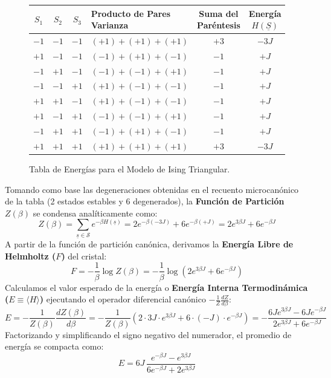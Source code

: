 \begin{ejemplo}
\begin{figure}
    \begin{center}
    \small
    \begin{tabular}{ccc|lc|c}
    $S_1$ & $S_2$ & $S_3$ & Producto de Pares Varianza & Suma del Paréntesis & Energía $H(\underline{S})$ \\
    \hline
    $-1$ & $-1$ & $-1$ & $(+1) + (+1) + (+1)$ & $+3$ & $-3J$ \\
    $+1$ & $-1$ & $-1$ & $(-1) + (+1) + (-1)$ & $-1$ & $+J$ \\
    $-1$ & $+1$ & $-1$ & $(-1) + (-1) + (+1)$ & $-1$ & $+J$ \\
    $-1$ & $-1$ & $+1$ & $(+1) + (-1) + (-1)$ & $-1$ & $+J$ \\
    $+1$ & $+1$ & $-1$ & $(+1) + (-1) + (-1)$ & $-1$ & $+J$ \\
    $+1$ & $-1$ & $+1$ & $(-1) + (-1) + (+1)$ & $-1$ & $+J$ \\
    $-1$ & $+1$ & $+1$ & $(-1) + (+1) + (-1)$ & $-1$ & $+J$ \\
    $+1$ & $+1$ & $+1$ & $(+1) + (+1) + (+1)$ & $+3$ & $-3J$ \\
    \end{tabular}
    \end{center}
    \caption{Tabla de Energías para el Modelo de Ising Triangular.}
    \label{tab:ising_triangle}
\end{figure}
\noindent 
Tomando como base las degeneraciones obtenidas en el recuento microcanónico de la tabla (2 estados estables y 6 degenerados), la \textbf{Función de Partición} $Z(\beta)$ se condensa analíticamente como:
\[
Z(\beta) = \sum_{\underline{s} \in \mathcal{S}} e^{-\beta H(\underline{s})} = 2e^{-\beta(-3J)} + 6e^{-\beta(+J)} = 2e^{3\beta J} + 6e^{-\beta J}
\]
A partir de la función de partición canónica, derivamos la \textbf{Energía Libre de Helmholtz ($F$)} del cristal:
\[
F = -\frac{1}{\beta} \log Z(\beta) = -\frac{1}{\beta} \log\left(2e^{3\beta J} + 6e^{-\beta J}\right)
\]
Calculamos el valor esperado de la energía o \textbf{Energía Interna Termodinámica ($E \equiv \langle H \rangle$)} ejecutando el operador diferencial canónico $-\frac{1}{Z}\frac{dZ}{d\beta}$:
\[
E = -\frac{1}{Z(\beta)} \frac{dZ(\beta)}{d\beta} = -\frac{1}{Z(\beta)} \left(2 \cdot 3J \cdot e^{3\beta J} + 6 \cdot (-J) \cdot e^{-\beta J}\right) = -\frac{6J e^{3\beta J} - 6J e^{-\beta J}}{2e^{3\beta J} + 6e^{-\beta J}}
\]
Factorizando y simplificando el signo negativo del numerador, el promedio de energía se compacta como:
\[
E = 6J \, \frac{e^{-\beta J} - e^{3\beta J}}{6e^{-\beta J} + 2e^{3\beta J}}
\]


\end{ejemplo}

